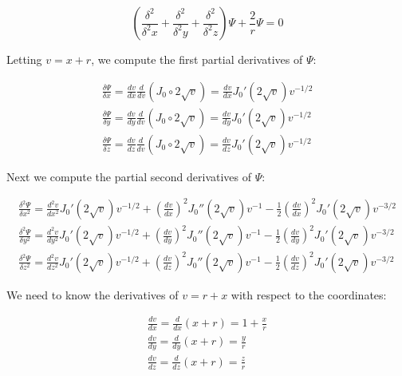 \documentclass{article}
\begin{document}
\begin{equation}
\label{claim}
\left(\frac{\delta^2}{\delta^2 x} + \frac{\delta^2}{\delta^2 y} + \frac{\delta^2}{\delta^2 z}\right) \Psi + \frac{2}{r}\Psi = 0
\end{equation}

\vskip 12pt

Letting $v=x+r$, we compute the first partial derivatives of $\Psi$:

\begin{equation}
\begin{gathered}
\frac{\delta \Psi}{\delta x} = \frac{d v}{d x} \frac{d}{d v} \left(J_0 \circ 2\sqrt{v}\right) = \frac{d v}{d x} J_0'(2\sqrt{v}) v^{-1/2} \\
\frac{\delta \Psi}{\delta y} = \frac{d v}{d y} \frac{d}{d v} \left(J_0 \circ 2\sqrt{v}\right) = \frac{d v}{d y} J_0'(2\sqrt{v}) v^{-1/2} \\
\frac{\delta \Psi}{\delta z} = \frac{d v}{d z} \frac{d}{d v} \left(J_0 \circ 2\sqrt{v}\right) = \frac{d v}{d z} J_0'(2\sqrt{v}) v^{-1/2}
\end{gathered}
\end{equation}

\vskip 12pt

Next we compute the partial second derivatives of $\Psi$:

\begin{equation}
\label{second partials}
\begin{gathered}
\frac{\delta^2 \Psi}{\delta x^2} = \frac{d^2 v}{d x^2} J_0'(2\sqrt{v}) v^{-1/2} + \left(\frac{d v}{d x}\right)^2 J_0''(2\sqrt{v}) v^{-1} - \frac{1}{2} \left(\frac{d v}{d x}\right)^2 J_0'(2\sqrt{v}) v^{-3/2} \\
\frac{\delta^2 \Psi}{\delta y^2} = \frac{d^2 v}{d y^2} J_0'(2\sqrt{v}) v^{-1/2} + \left(\frac{d v}{d y}\right)^2 J_0''(2\sqrt{v}) v^{-1} - \frac{1}{2} \left(\frac{d v}{d y}\right)^2 J_0'(2\sqrt{v}) v^{-3/2} \\
\frac{\delta^2 \Psi}{\delta z^2} = \frac{d^2 v}{d z^2} J_0'(2\sqrt{v}) v^{-1/2} + \left(\frac{d v}{d z}\right)^2 J_0''(2\sqrt{v}) v^{-1} - \frac{1}{2} \left(\frac{d v}{d z}\right)^2 J_0'(2\sqrt{v}) v^{-3/2}
\end{gathered}
\end{equation}

\vskip 12pt

We need to know the derivatives of $v=r+x$ with respect to the coordinates:

\vskip 12pt

\begin{equation}
\label{first v}
\begin{gathered}
\frac{d v}{d x} = \frac{d}{d x} (x+r) = 1 + \frac{x}{r} \\
\frac{d v}{d y} = \frac{d}{d y} (x+r) = \frac{y}{r} \\
\frac{d v}{d z} = \frac{d}{d z} (x+r) = \frac{z}{r}
\end{gathered}
\end{equation}
\end{document}
